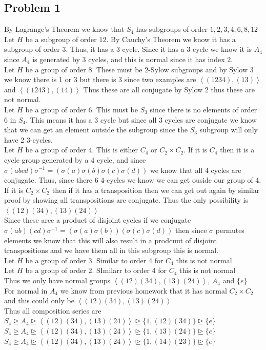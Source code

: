 \documentclass[12pt, letterpaper]{article}
\theoremstyle{definition}
\newcommand{\ang}[1]{\left\langle #1 \right\rangle}
\begin{document}
\pagestyle{fancy}
\fancyhf{}
\fancyhead[ROE]{\thepage}

\subsection*{Problem 1}
By Lagrange's Theorem we know that $S_4$ has subgroups of order $1,2,3,4,6,8,12$\\
Let $H$ be a subgroup of order $12$. By Cauchy's Theorem we know it has a subgroup of order $3$. Thus, it has a 3 cycle.
Since it has a 3 cycle we know it is $A_4$ since $A_4$ is generated by 3 cycles, and this is normal since it has index 2.\\
Let $H$ be a group of order $8$. These must be $2$-Sylow subgroups and by Sylow 3 we know there is 1 or 3 but there is 3 since two examples are $\ang{(1234),(13)}$ and $\ang{(1243),(14)}$
Thus these are all conjugate by Sylow 2 thus these are not normal.\\
Let $H$ be a group of order 6. This must be $S_3$ since there is no elements of order $6$ in $S_4$. This means it has a $3$ cycle but since all $3$ cycles are conjugate we know that we can get an
element outside the subgroup since the $S_3$ subgroup will only have 2 3-cycles.\\
Let $H$ be a group of order 4. This is either $C_4$ or $C_2 \times C_2$. If it is $C_4$ then it is a cycle group generated by a 4 cycle, and since $\sigma(abcd)\sigma^{-1}=(\sigma(a)\sigma(b)\sigma(c)\sigma(d))$ we know that all $4$ cycles 
are conjugate. Thus, since there 6 4-cycles we know we can get ouside our group of 4.\\
If it is $C_2\times C_2$ then if it has a transposition then we can get out again by similar proof by showing all transpositions are conjugate. Thus the only possibility is $\ang{(12)(34),(13)(24)}$\\
Since these aree a product of disjoint cycles if we conjugate $\sigma(ab)(cd)\sigma^{-1}=(\sigma(a)\sigma(b))(\sigma(c)\sigma(d))$ then since $\sigma$ permutes elements we know that this will also result in a prodcuut of disjoint transpositions and we have them all in this subgroup this is normal.\\
Let $H$ be a group of order 3. Similar to order 4 for $C_4$ this is not normal\\
Let $H$ be a group of order 2. SImilarr to order 4 for $C_4$ this is not normal\\
Thus we only have normal groups $\ang{(12)(34),(13)(24)}$, $A_4$ and $\{e\}$\\
For normal in $A_4$ we know from previous homework that it has normal $C_2\times C_2$ and this could only be $\ang{(12)(34),(13)(24)}$\\
Thus all composition series are\\
$S_4 \unrhd A_4 \unrhd \ang{(12)(34),(13)(24)} \unrhd \{1, (12)(34)\} \unrhd \{e\}$\\
$S_4 \unrhd A_4 \unrhd \ang{(12)(34),(13)(24)} \unrhd \{1, (13)(24)\} \unrhd \{e\}$\\
$S_4 \unrhd A_4 \unrhd \ang{(12)(34),(13)(24)} \unrhd \{1, (14)(23)\} \unrhd \{e\}$
\end{document}
